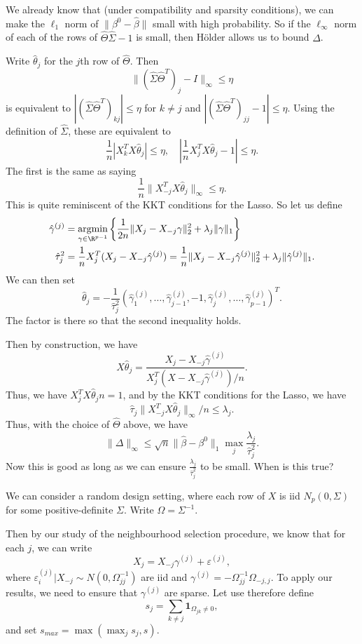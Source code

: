 \documentclass[a4paper]{article}
\DeclareMathOperator*\argmin{argmin}
\begin{document}
We already know that (under compatibility and sparsity conditions), we can make the $\ell_1$ norm of $\|\beta^0 - \hat{\beta}\|$ small with high probability. So if the $\ell_\infty$ norm of each of the rows of $\hat{\Theta} \hat{\Sigma} - 1$ is small, then H\"older allows us to bound $\Delta$.

Write $\hat{\theta}_j$ for the $j$th row of $\hat{\Theta}$. Then
\[
  \|(\hat{\Sigma} \hat{\Theta}^T)_j - I \|_\infty \leq \eta
\]
is equivalent to $|(\hat{\Sigma} \hat{\Theta}^T)_{kj}| \leq \eta$ for $k \not= j$ and $|(\hat{\Sigma} \hat{\Theta}^T)_{jj} - 1 | \leq \eta$. Using the definition of $\hat{\Sigma}$, these are equivalent to
\[
  \frac{1}{n}|X_k^T X \hat{\theta}_j| \leq \eta,\quad \left|\frac{1}{n} X^T_j X \hat{\theta}_j - 1 \right| \leq \eta.
\]
The first is the same as saying
\[
  \frac{1}{n} \|X_{-j}^T X \hat{\theta}_j\|_\infty \leq \eta.
\]
This is quite reminiscent of the KKT conditions for the Lasso. So let us define
\begin{align*}
  \hat{\gamma}^{(j)} &= \argmin_{\gamma \in \R^{p - 1}} \left\{\frac{1}{2n} \|X_j - X_{-j} \gamma\|_2^2 + \lambda_j \|\gamma\|_1\right\}\\
  \hat{\tau}_j^2 &= \frac{1}{n} X_j^T (X_j - X_{-j} \hat{\gamma}^{(j)}) = \frac{1}{n} \|X_j - X_{-j} \hat{\gamma}^{(j)}\|_2^2 + \lambda_j \|\hat{\gamma}^{(j)}\|_1.
\end{align*}
We can then set
\[
  \hat{\theta}_j = -\frac{1}{\hat{\tau}_j^2} (\hat{\gamma}_1^{(j)}, \ldots, \hat{\gamma}_{j - 1}^{(j)}, -1, \hat{\gamma}_j^{(j)}, \ldots, \hat{\gamma}_{p - 1}^{(j)})^T.
\]
The factor is there so that the second inequality holds.

Then by construction, we have
\[
  X \hat{\theta}_j = \frac{X_j - X_{-j} \hat{\gamma}^{(j)}}{X^T_j(X - X_{-j} \hat{\gamma}^{(j)})/n}.
\]
Thus, we have $X_j^T X \hat{\theta}_j n = 1$, and by the KKT conditions for the Lasso, we have
\[
  \hat{\tau}_j \|X_{-j}^T X \hat{\theta}_j\|_{\infty}/n \leq \lambda_j.
\]
Thus, with the choice of $\hat{\Theta}$ above, we have
\[
  \|\Delta\|_{\infty} \leq \sqrt{n} \|\hat{\beta} - \beta^0\|_1 \max_j \frac{\lambda_j}{\hat{\tau}_j^2}.
\]
Now this is good as long as we can ensure $\frac{\lambda_j}{\hat{\tau}_j^2}$ to be small. When is this true?

We can consider a random design setting, where each row of $X$ is iid $N_p(0, \Sigma)$ for some positive-definite $\Sigma$. Write $\Omega = \Sigma^{-1}$.

Then by our study of the neighbourhood selection procedure, we know that for each $j$, we can write
\[
  X_j = X_{-j} \gamma^{(j)} + \varepsilon^{(j)},
\]
where $\varepsilon_i^{(j)}| X_{-j} \sim N(0, \Omega_{jj}^{-1})$ are iid and $\gamma^{(j)} = - \Omega_{jj}^{-1} \Omega_{-j, j}$. To apply our results, we need to ensure that $\gamma^{(j)}$ are sparse. Let use therefore define
\[
  s_j = \sum_{k \not= j} \mathbf{1}_{\Omega_{jk} \not =0},
\]
and set $s_{max} = \max (\max_j s_j, s)$.
\end{document}
